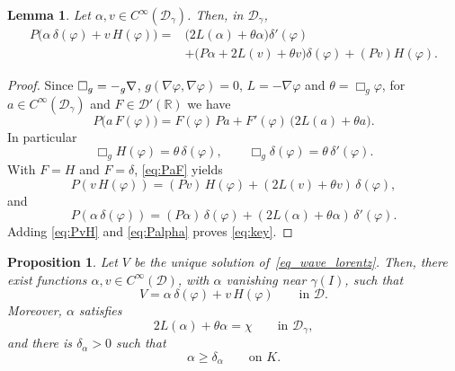 \documentclass[12pt,reqno]{amsart}
\numberwithin{equation}{section}
\theoremstyle{definition}
\theoremstyle{plain}
\newtheorem{lemma}[theorem]{Lemma}
\newtheorem{proposition}[theorem]{Proposition}
\theoremstyle{definition}
\theoremstyle{definition}
\newcommand{\R}{\mathbb{R}}
\newcommand{\D}{\mathcal{D}}
\newcommand{\dg}{\D_\gamma}
\let\div\relax
\DeclareMathOperator{\div}{div}
\def\R{\mathbb R}
\let\div\relax
\DeclareMathOperator{\div}{div}
\begin{document}
\begin{lemma}
\label{lem:key}
Let $\alpha,v\in C^\infty(\dg)$. Then, in $\dg$,
\begin{equation}
\begin{aligned}
  P\bigl(\alpha\,\delta(\varphi)+v\,H(\varphi)\bigr)
  ={}&
  \bigl(2L(\alpha)+\theta\alpha\bigr)\delta'(\varphi)
  \\
  &+
  \bigl(P\alpha+2L(v)+\theta v\bigr)\delta(\varphi)
  +
  (Pv)H(\varphi).
\end{aligned}
\label{eq:key}
\end{equation}
\end{lemma}

\begin{proof}
Since $\Box_g=-\div_g\nabla$, $g(\nabla\varphi,\nabla\varphi)=0$, $L=-\nabla\varphi$ and $\theta=\Box_g\varphi$, for $a\in C^\infty(\dg)$ and $F\in\mathcal D'(\R)$ we have
\begin{equation}\label{eq:PaF}
P\bigl(a\,F(\varphi)\bigr)=F(\varphi)\,Pa+F'(\varphi)\,\bigl(2L(a)+\theta a\bigr).
\end{equation}
In particular
\begin{equation}
  \Box_gH(\varphi)=\theta\,\delta(\varphi),
  \qquad
  \Box_g\delta(\varphi)=\theta\,\delta'(\varphi).
  \label{eq:box-H-delta}
\end{equation}
With $F=H$ and $F=\delta$, \eqref{eq:PaF} yields
\begin{equation}
  P(v\,H(\varphi))
  =
  (Pv)\,H(\varphi)
  +
  (2L(v)+\theta v)\,\delta(\varphi),
  \label{eq:PvH}
\end{equation}
and
\begin{equation}
  P(\alpha\,\delta(\varphi))
  =
  (P\alpha)\,\delta(\varphi)
  +
  (2L(\alpha)+\theta\alpha)\,\delta'(\varphi).
  \label{eq:Palpha}
\end{equation}
Adding \eqref{eq:PvH} and \eqref{eq:Palpha} proves \eqref{eq:key}.
\end{proof}


\begin{proposition}
\label{prop_prog_wave}
Let $V$ be the unique solution of~\eqref{eq_wave_lorentz}. Then, there exist functions $\alpha,v\in C^\infty(\mathcal{D})$, with $\alpha$ vanishing near $\gamma(I)$,
such that
\begin{equation}
  V=\alpha\,\delta(\varphi)+v\,H(\varphi)
  \qquad\text{in }\mathcal{D}.
  \label{eq:main}
\end{equation}
Moreover, $\alpha$ satisfies
\begin{equation}
  2L(\alpha)+\theta\alpha=\chi
  \qquad\text{in }\dg,
  \label{eq:alpha}
\end{equation}
and there is $\delta_\alpha>0$ such that
\begin{equation}
  \alpha\ge\delta_\alpha\qquad\text{on }K.
  \label{eq:alpha-lower}
\end{equation}
\end{proposition}
\end{document}
